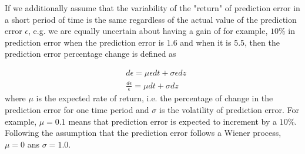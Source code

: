 \documentclass[11pt, onecolumn]{article}
\begin{document}
If we additionally assume that the variability of the "return" of prediction error in a short period of time is the same regardless of the actual value of the prediction error $\epsilon$, e.g. we are equally uncertain about having a gain of for example, $10\%$ in prediction error when the prediction error is 1.6 and when it is 5.5, then the prediction error percentage change is defined as

\begin{equation}
\begin{split}
& d \epsilon= \mu \epsilon dt + \sigma \epsilon dz \\
& \frac{d \epsilon}{\epsilon}= \mu dt + \sigma dz
\end{split}
\label{eq:wiener}
\end{equation}
where $\mu$ is the expected rate of return, i.e. the percentage of change in the prediction error for one time period and $\sigma$ is the volatility of prediction error. For example, $\mu = 0.1$ means that prediction error is expected to increment by a $10\%$. Following the assumption that the prediction error follows a Wiener process,
$\mu = 0$ ans $\sigma= 1.0$.

\end{document}
